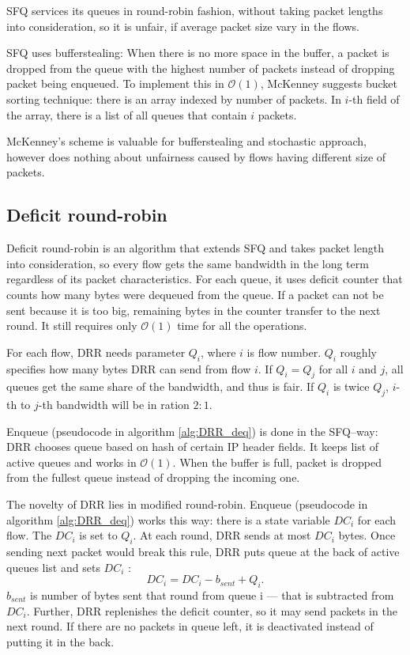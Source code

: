 SFQ services its queues in round-robin fashion, without taking packet lengths into consideration, so it is unfair, if average packet size vary in the flows.

SFQ uses bufferstealing: When there is no more space in the buffer, a packet is dropped from the queue with the highest number of packets instead of dropping packet being enqueued. To implement this in $\mathcal{O}(1)$, McKenney suggests bucket sorting technique: there is an array indexed by number of packets. In $i$-th field of the array, there is a list of all queues that contain $i$ packets.

McKenney's scheme is valuable for bufferstealing and stochastic approach, however does nothing about unfairness caused by flows having different size of packets.

\subsection{Deficit round-robin}
\label{DRR}
Deficit round-robin \cite{EffDRR} is an algorithm that extends SFQ and takes packet length into consideration, so every flow gets the same bandwidth in the long term regardless of its packet characteristics. For each queue, it uses deficit counter that counts how many bytes were dequeued from the queue. If a packet can not be sent because it is too big, remaining bytes in the counter transfer to the next round. It still requires only $\mathcal{O}(1)$ time for all the operations.

For each flow, DRR needs parameter $Q_i$, where $i$ is flow number. $Q_i$ roughly specifies how many bytes DRR can send from flow $i$. If $Q_i = Q_j$ for all $i$ and $j$, all queues get the same share of the bandwidth, and thus is fair. If $Q_i$ is twice $Q_j$, $i$-th to $j$-th bandwidth will be in ration $2:1$.

Enqueue (pseudocode in algorithm \autoref{alg:DRR_deq}) is done in the SFQ--way: DRR chooses queue based on hash of certain IP header fields. It keeps list of active queues and works in $\mathcal{O}(1)$. When the buffer is full, packet is dropped from the fullest queue instead of dropping the incoming one.

The novelty of DRR lies in modified round-robin. Enqueue (pseudocode in algorithm \autoref{alg:DRR_deq}) works this way: there is a state variable $DC_i$ for each flow. The $DC_i$ is set to $Q_i$. At each round, DRR sends at most $DC_i$ bytes. Once sending next packet would break this rule, DRR puts queue  at the back of active queues list and sets $DC_i$ :
\[
  DC_i = DC_i - b_{sent} + Q_i.
\]
$b_{sent}$ is number of bytes sent that round from queue i --- that is subtracted from $DC_i$. Further, DRR replenishes the deficit counter, so it may send packets in the next round. If there are no packets in queue left, it is deactivated instead of putting it in the back.

